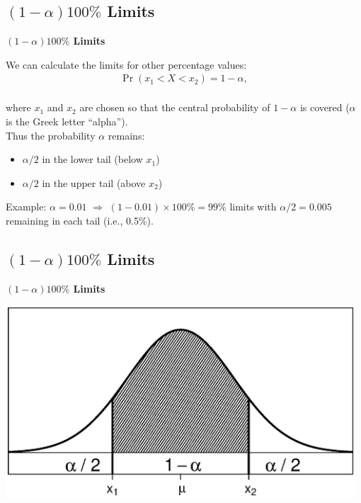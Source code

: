 \documentclass[compress]{beamer}        %
\makeatletter
\newcommand{\tcb}{\textcolor{beamer@blendedblue}}
\makeatother
\begin{document}
\subsection{$(1-\alpha)100\%$ Limits}
\begin{frame}{\bf \tcb{$(1-\alpha)100\%$ Limits}}

We can calculate the limits for other percentage values:\\[0.1cm]

\begin{align*}
\Pr(x_1 < X < x_2) = 1-\alpha,\\[-0.0cm]
\end{align*}

where $x_1$ and $x_2$ are chosen so that the central probability of $1-\alpha$ is covered ($\alpha$ is the Greek letter ``alpha'').\\[0.5cm]

Thus the probability $\alpha$ remains:\\[0.1cm]
\begin{itemize}\itemsep0.3cm
\item $\alpha/2$ in the lower tail (below $x_1$)
\item $\alpha/2$ in the upper tail (above $x_2$)\\[0.5cm]
\end{itemize}

Example: $\alpha=0.01$ $\Rightarrow$ $(1-0.01)\times100\% = 99\%$ limits with $\alpha/2 = 0.005$ remaining in each tail (i.e., 0.5\%).

\end{frame}


\subsection{$(1-\alpha)100\%$ Limits}
\begin{frame}{\bf \tcb{$(1-\alpha)100\%$ Limits}}

\begin{center}
\includegraphics[width=0.98\textwidth, trim = 1.5cm 1.5cm 0.7cm 1.5cm, clip]{NormAlpha}
\end{center}

\end{frame}
\end{document}
